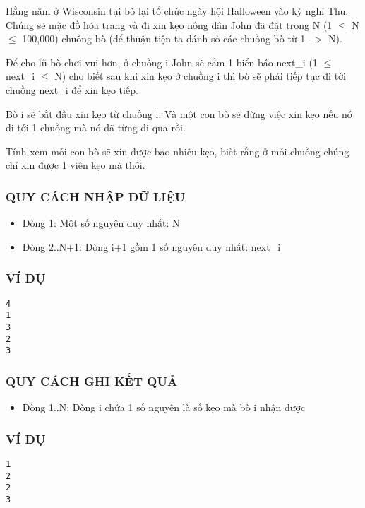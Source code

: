 



   Hằng năm ở Wisconsin tụi bò lại tổ chức ngày hội Halloween vào kỳ nghỉ Thu. Chúng sẽ mặc đồ hóa trang và đi xin kẹo nông dân John đã đặt trong  N (1  $\le$  N  $\le$  100,000) chuồng bò (để thuận tiện ta đánh số các chuồng  bò từ 1 -$>$ N).  

   Để cho lũ bò chơi vui hơn, ở chuồng i John sẽ cắm 1 biển báo next\_i  (1  $\le$  next\_i  $\le$  N) cho biết sau khi xin kẹo ở chuồng i thì bò sẽ phải  tiếp tục đi tới chuồng next\_i để xin kẹo tiếp.  

   Bò i sẽ bắt đầu xin kẹo từ chuồng i. Và một con bò sẽ dừng việc xin kẹo nếu nó đi tới 1 chuồng mà nó đã từng đi qua rồi.  

   Tính xem mỗi con bò sẽ xin được bao nhiêu kẹo, biết rằng ở mỗi chuồng chúng chỉ xin được 1 viên kẹo mà thôi.  

\subsubsection{   QUY CÁCH NHẬP DỮ LIỆU  }
\begin{itemize}
	\item     Dòng 1: Một số nguyên duy nhất: N   
	\item     Dòng 2..N+1: Dòng i+1 gồm 1 số nguyên duy nhất: next\_i   
\end{itemize}

\subsubsection{   VÍ DỤ  }
\begin{verbatim}
4
1
3
2
3
\end{verbatim}

\subsubsection{   QUY CÁCH GHI KẾT QUẢ  }
\begin{itemize}
	\item     Dòng 1..N: Dòng i chứa 1 số nguyên là số kẹo mà bò i nhận được   
\end{itemize}

\subsubsection{   VÍ DỤ  }
\begin{verbatim}
1
2
2
3
\end{verbatim}
